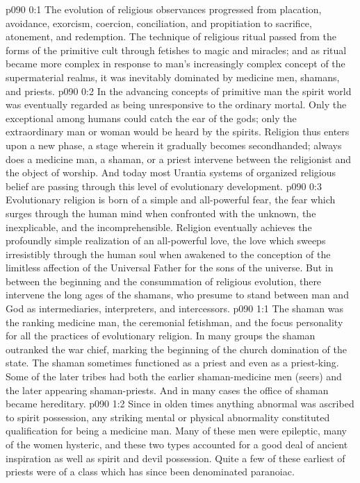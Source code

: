 \author{Melchizedek}
\vs p090 0:1 The evolution of religious observances progressed from placation, avoidance, exorcism, coercion, conciliation, and propitiation to sacrifice, atonement, and redemption. The technique of religious ritual passed from the forms of the primitive cult through fetishes to magic and miracles; and as ritual became more complex in response to man’s increasingly complex concept of the supermaterial realms, it was inevitably dominated by medicine men, shamans, and priests.
\vs p090 0:2 In the advancing concepts of primitive man the spirit world was eventually regarded as being unresponsive to the ordinary mortal. Only the exceptional among humans could catch the ear of the gods; only the extraordinary man or woman would be heard by the spirits. Religion thus enters upon a new phase, a stage wherein it gradually becomes secondhanded; always does a medicine man, a shaman, or a priest intervene between the religionist and the object of worship. And today most Urantia systems of organized religious belief are passing through this level of evolutionary development.
\vs p090 0:3 Evolutionary religion is born of a simple and all\hyp{}powerful fear, the fear which surges through the human mind when confronted with the unknown, the inexplicable, and the incomprehensible. Religion eventually achieves the profoundly simple realization of an all\hyp{}powerful love, the love which sweeps irresistibly through the human soul when awakened to the conception of the limitless affection of the Universal Father for the sons of the universe. But in between the beginning and the consummation of religious evolution, there intervene the long ages of the shamans, who presume to stand between man and God as intermediaries, interpreters, and intercessors.
\vs p090 1:1 The shaman was the ranking medicine man, the ceremonial fetishman, and the focus personality for all the practices of evolutionary religion. In many groups the shaman outranked the war chief, marking the beginning of the church domination of the state. The shaman sometimes functioned as a priest and even as a priest\hyp{}king. Some of the later tribes had both the earlier shaman\hyp{}medicine men (seers) and the later appearing shaman\hyp{}priests. And in many cases the office of shaman became hereditary.
\vs p090 1:2 Since in olden times anything abnormal was ascribed to spirit possession, any striking mental or physical abnormality constituted qualification for being a medicine man. Many of these men were epileptic, many of the women hysteric, and these two types accounted for a good deal of ancient inspiration as well as spirit and devil possession. Quite a few of these earliest of priests were of a class which has since been denominated paranoiac.
